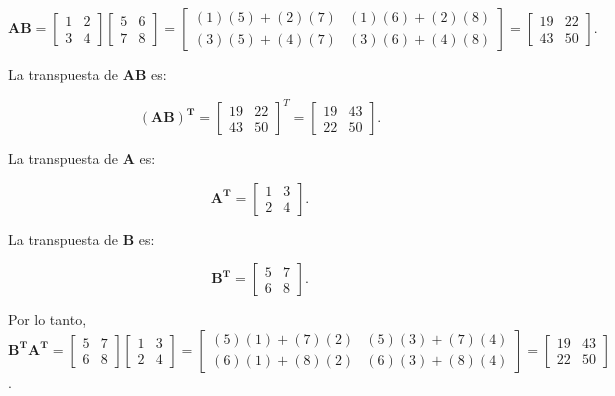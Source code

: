 \begin{}
\begin{solution}
\[
\boldsymbol{AB} = \begin{bmatrix} 1 & 2 \\ 3 & 4 \end{bmatrix} \begin{bmatrix} 5 & 6 \\ 7 & 8 \end{bmatrix} = \begin{bmatrix} (1)(5) + (2)(7) & (1)(6) + (2)(8) \\ (3)(5) + (4)(7) & (3)(6) + (4)(8) \end{bmatrix} = \begin{bmatrix} 19 & 22 \\ 43 & 50 \end{bmatrix}.
\]

La transpuesta de $\boldsymbol{AB}$ es:

\[
\boldsymbol{(AB)^T} = \begin{bmatrix} 19 & 22 \\ 43 & 50 \end{bmatrix}^T = \begin{bmatrix} 19 & 43 \\ 22 & 50 \end{bmatrix}.
\]

La transpuesta de $\boldsymbol{{A}}$ es:

\[
\boldsymbol{A^T} = \begin{bmatrix} 1 & 3 \\ 2 & 4 \end{bmatrix}.
\]

La transpuesta de $\boldsymbol{B}$ es:

\[
\boldsymbol{B^T}= \begin{bmatrix} 5 & 7 \\ 6 & 8 \end{bmatrix}.
\]

Por lo tanto, $\boldsymbol{B^T A^T} = \begin{bmatrix} 5 & 7 \\ 6 & 8 \end{bmatrix} \begin{bmatrix} 1 & 3 \\ 2 & 4 \end{bmatrix} = \begin{bmatrix} (5)(1) + (7)(2) & (5)(3) + (7)(4) \\ (6)(1) + (8)(2) & (6)(3) + (8)(4) \end{bmatrix} = \begin{bmatrix} 19 & 43 \\ 22 & 50 \end{bmatrix}$.


\end{solution}
\end{}
